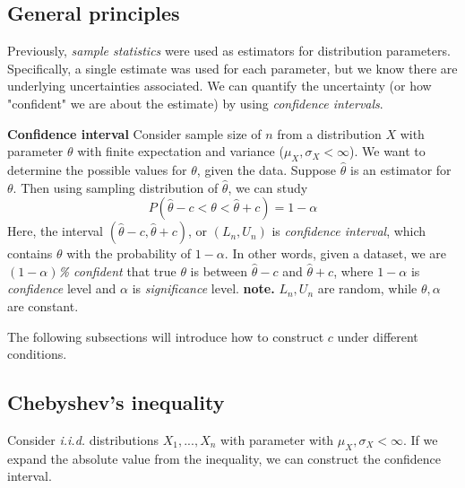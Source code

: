 \documentclass[a4paper]{article}
\begin{document}
\subsection{General principles}
Previously, \textit{sample statistics} were used as estimators for distribution parameters. 
Specifically, a single estimate was used for each parameter, but we know there are underlying uncertainties associated.
We can quantify the uncertainty (or how "confident" we are about the estimate) by using \textit{confidence intervals}.
\newline
\begin{mdframed}[]
    \textbf{Confidence interval}
    \newline
    Consider sample size of $n$ from a distribution $X$ with parameter $\theta$ with finite expectation and variance ($\mu_{X}, \sigma_{X} < \infty$).
    We want to determine the possible values for $\theta$, given the data.
    \newline
    Suppose $\hat{\theta}$ is an estimator for ${\theta}$. Then using sampling distribution of $\hat{\theta}$, we can study 
    \newline
    $$P(\hat{\theta}-c < \theta < \hat{\theta} + c) = 1-\alpha$$
    \newline
    Here, the interval $(\hat{\theta}-c, \hat{\theta} + c)$, or $(L_n, U_n)$ is \textit{confidence interval}, which contains $\theta$ with the probability of $1-\alpha$.
    In other words, given a dataset, we are \textit{$(1-\alpha)$\% confident} that true $\theta$ is between $\hat{\theta}-c$ and $\hat{\theta} + c$, where $1-\alpha$ is \textit{confidence} level and $\alpha$ is \textit{significance} level.
    \newline
    \textbf{note.} $L_n, U_n$ are random, while $\theta, \alpha$ are constant.
\end{mdframed}
The following subsections will introduce how to construct $c$ under different conditions.

\subsection{Chebyshev's inequality}
Consider \textit{i.i.d.} distributions $X_1,...,X_n$ with parameter with $\mu_{X}, \sigma_{X} < \infty$.
\newline
If we expand the absolute value from the inequality, we can construct the confidence interval.
\end{document}
